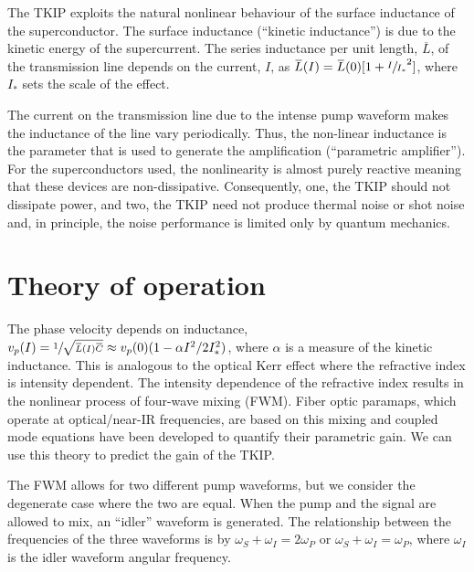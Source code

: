 The TKIP exploits the natural nonlinear behaviour of the surface inductance of the superconductor.  The surface inductance (``kinetic inductance'') is due to the kinetic energy of the supercurrent. The series inductance per unit length, $\overbar{L}$, of the transmission line depends on the current, $I$, as $\overbar{L}(I) = \overbar{L}(0)[1+ \sfrac{I}{I_*}^2]$, where $I_*$ sets the scale of the effect. 

The current on the transmission line due to the intense pump waveform makes the inductance of the line vary periodically. Thus, the non-linear inductance is the parameter that is used to generate the amplification (``parametric amplifier'').  For the superconductors used, the nonlinearity is almost purely reactive meaning that these devices are non-dissipative. Consequently, one, the TKIP should not dissipate power, and two, the TKIP need not produce thermal noise or shot noise and, in principle, the noise performance is limited only by quantum mechanics.


\section{Theory of operation}
The phase velocity depends on inductance, $v_{p}(I)= \sfrac{1}{\sqrt{\overbar{L}(I)\overbar{C}}} \approx v_{p}(0)(1 - \alpha I^2 / 2 I^2_*)$, where $\alpha$ is a measure of the kinetic inductance. This is analogous to the optical Kerr effect where the refractive index is intensity dependent. The intensity dependence of the refractive index results in the nonlinear process of four-wave mixing (FWM). Fiber optic paramaps, which operate at optical/near-IR frequencies, are based on this mixing \cite{Hansryd2002} and coupled mode equations have been developed to quantify their parametric gain. We can use this theory \cite{Stolen1982} to predict the gain of the TKIP. 

 
The FWM allows for two different  pump waveforms, but we consider the degenerate case where the two are equal. When the pump and the signal are allowed to mix, an ``idler''  waveform is  generated. The relationship between the frequencies of the three waveforms is by $\omega_S+\omega_I = 2\omega_P$ or $\omega_S+\omega_I = \omega_P$, where $\omega_I$ is the idler waveform angular frequency.


